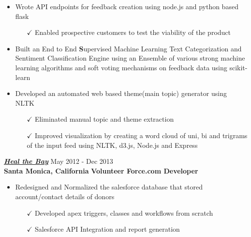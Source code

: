 \begin{itemize} \itemsep -2pt %
 \item Wrote API endpoints for feedback creation using node.js and python based flask \itemsep -2pt
   \begin{itemize}
     \item[$\checkmark$]  \itemsep -8pt%
   Enabled prospective customers to test the viability of the product\\
       \end{itemize}       
\end{itemize}

   \begin{itemize} \itemsep -2pt %
 \item Built an End to End {\textbf Supervised Machine Learning} Text Categorization and Sentiment Classification Engine using an Ensemble of various strong machine learning algorithms and soft voting mechanisms on feedback data using scikit-learn  \itemsep -2pt
\end{itemize}

   \begin{itemize} \itemsep -2pt %
  \item Developed an automated web based theme(main topic) generator using NLTK\itemsep -2pt
   \begin{itemize}
    \item[$\checkmark$]  \itemsep -8pt%
   Eliminated manual topic and theme extraction\\
     \item[$\checkmark$]  \itemsep -8pt%
   Improved visualization by creating a word cloud of uni, bi and trigrams of the input feed using NLTK, d3.js, Node.js and Express\\
      \end{itemize}         
      \end{itemize}


   


   

\vspace{-2pt}
{\sl \href{www.healthebay.org/?}{\textbf{Heal the Bay}}} \hfill        May 2012 - Dec 2013 \\
  {\textbf{Santa Monica, California}}     \hfill   \textbf{Volunteer Force.com Developer}
   \begin{itemize} \itemsep -2pt %
   \item {Redesigned and Normalized the salesforce database that stored account/contact details of donors} \itemsep -2pt
   \begin{itemize}\item[$\checkmark$]  \itemsep -8pt%
   Developed apex triggers, classes and workflows from scratch
   \end{itemize}
     \begin{itemize}\item[$\checkmark$]  \itemsep -8pt%
   Salesforce API Integration and report generation
    \end{itemize}
       \end{itemize}
       
